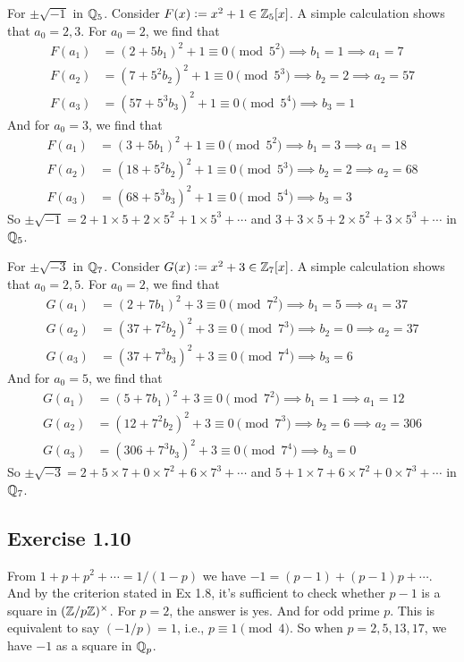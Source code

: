 \documentclass[../Koblitz.tex]{subfiles}
\begin{document}
For $\pm\sqrt{-1}$ in $\mathbb{Q}_5$. Consider $F(x):=x^2+1\in\mathbb{Z}_5[x]$. A simple calculation shows that $a_0=2,3$. For $a_0=2$, we find that
\begin{align*}
F(a_1)&=(2+5b_1)^2+1\equiv 0\pmod{5^2} \implies b_1=1 \implies a_1=7 \\
F(a_2)&=(7+5^2b_2)^2+1\equiv 0\pmod{5^3} \implies b_2=2 \implies a_2=57 \\
F(a_3)&=(57+5^3b_3)^2+1\equiv 0\pmod{5^4} \implies b_3=1
\end{align*}
And for $a_0=3$, we find that
\begin{align*}
F(a_1)&=(3+5b_1)^2+1\equiv 0\pmod{5^2} \implies b_1=3 \implies a_1=18 \\
F(a_2)&=(18+5^2b_2)^2+1\equiv 0\pmod{5^3} \implies b_2=2 \implies a_2=68 \\
F(a_3)&=(68+5^3b_3)^2+1\equiv 0\pmod{5^4} \implies b_3=3
\end{align*}
So $\pm\sqrt{-1}=2+1\times5+2\times5^2+1\times5^3+\cdots$ and $3+3\times5+2\times5^2+3\times5^3+\cdots$ in $\mathbb{Q}_5$.

For $\pm\sqrt{-3}$ in $\mathbb{Q}_7$. Consider $G(x):=x^2+3\in\mathbb{Z}_7[x]$. A simple calculation shows that $a_0=2,5$. For $a_0=2$, we find that
\begin{align*}
G(a_1)&=(2+7b_1)^2+3\equiv 0\pmod{7^2} \implies b_1=5 \implies a_1=37 \\
G(a_2)&=(37+7^2b_2)^2+3\equiv 0\pmod{7^3} \implies b_2=0 \implies a_2=37\\
G(a_3)&=(37+7^3b_3)^2+3\equiv 0\pmod{7^4} \implies b_3=6
\end{align*}
And for $a_0=5$, we find that
\begin{align*}
G(a_1)&=(5+7b_1)^2+3\equiv 0\pmod{7^2} \implies b_1=1 \implies a_1=12 \\
G(a_2)&=(12+7^2b_2)^2+3\equiv 0\pmod{7^3} \implies b_2=6 \implies a_2=306 \\
G(a_3)&=(306+7^3b_3)^2+3\equiv 0\pmod{7^4} \implies b_3=0
\end{align*}
So $\pm\sqrt{-3}=2+5\times7+0\times7^2+6\times7^3+\cdots$ and $5+1\times7+6\times7^2+0\times7^3+\cdots$ in $\mathbb{Q}_7$.


\subsection*{Exercise 1.10}

From $1+p+p^2+\cdots=1/(1-p)$ we have $-1=(p-1)+(p-1)p+\cdots$. And by the criterion stated in Ex 1.8, it's sufficient to check whether $p-1$ is a square in $(\mathbb{Z}/p\mathbb{Z})^\times$. For $p=2$, the answer is yes. And for odd prime $p$. This is equivalent to say $(-1/p)=1$, i.e., $p\equiv 1\pmod{4}$. So when $p=2,5,13,17$, we have $-1$ as a square in $\mathbb{Q}_p$.
\end{document}
